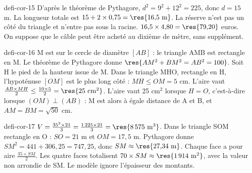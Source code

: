 \begin{blocEdition}{defi-cor-15}
D’après le théorème de Pythagore, $d^2=9^2+12^2=225$, donc $d=15$ m.
La longueur totale est $15+2\times0{,}75=\res{16{,}5\ \mathrm m}$. La réserve n’est pas un côté du triangle et n’entre pas sous la racine.
$16{,}5\times4{,}80=\res{79{,}20}$ euros. On suppose que le câble peut être acheté au dixième de mètre, sans supplément.\label{fig-defi-cor-15}

\end{blocEdition}
\begin{blocEdition}{defi-cor-16}
M est sur le cercle de diamètre $[AB]$ : le triangle AMB est rectangle en M. Le théorème de Pythagore donne $\res{AM^2+BM^2=AB^2=100}$.
Soit H le pied de la hauteur issue de M. Dans le triangle MHO, rectangle en H, l’hypoténuse $[OM]$ est le plus long côté : $MH\le OM=5$ cm. L’aire vaut $\frac{AB\times MH}2\le\frac{10\times5}2=\res{25\ \mathrm{cm}^2}$.
L’aire vaut 25 cm$^2$ lorsque $H=O$, c’est-à-dire lorsque $(OM)\perp(AB)$ : M est alors à égale distance de A et B, et $AM=BM=\sqrt{50}$ cm.\label{fig-defi-cor-16}

\end{blocEdition}
\begin{blocEdition}{defi-cor-17}
$V=\frac{35^2\times21}3=\frac{1\,225\times21}3=\res{8\,575\ \mathrm m^3}$.
Dans le triangle SOM rectangle en O : $SO=21$ m et $OM=17{,}5$ m. Pythagore donne $SM^2=441+306{,}25=747{,}25$, donc $SM\approx\res{27{,}34\ \mathrm m}$.
Chaque face a pour aire $\frac{35\times SM}2$. Les quatre faces totalisent $70\times SM\approx\res{1\,914\ \mathrm m^2}$, avec la valeur non arrondie de SM. Le modèle ignore l’épaisseur des montants.\label{fig-defi-cor-17}

\end{blocEdition}
